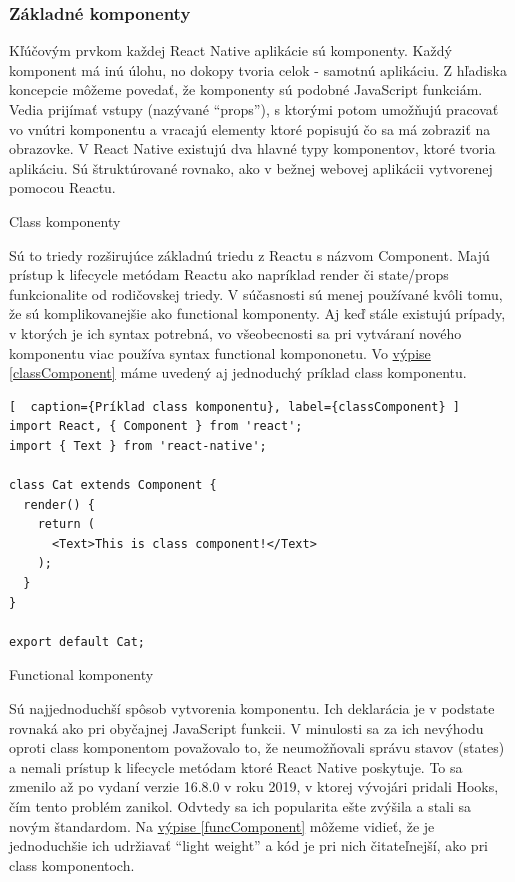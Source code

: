 \subsubsection{Základné komponenty}
Kľúčovým prvkom každej React Native aplikácie sú komponenty. Každý komponent má inú úlohu, no dokopy tvoria celok - samotnú aplikáciu. Z hľadiska koncepcie môžeme povedať, že komponenty sú podobné JavaScript funkciám. Vedia prijímať vstupy (nazývané ``props''), s ktorými potom umožňujú pracovať vo vnútri komponentu a vracajú elementy ktoré popisujú čo sa má zobraziť na obrazovke. V React Native existujú dva hlavné typy komponentov, ktoré tvoria aplikáciu. Sú štruktúrované rovnako, ako v bežnej webovej aplikácii vytvorenej pomocou Reactu.
\begin{itemize}[leftmargin=*]
{\bf \item Class komponenty} \newline
Sú to triedy rozširujúce základnú triedu z Reactu s názvom Component. Majú prístup k lifecycle metódam Reactu ako napríklad render či state/props funkcionalite od rodičovskej triedy. V súčasnosti sú menej používané kvôli tomu, že sú komplikovanejšie ako functional komponenty. Aj keď stále existujú prípady, v ktorých je ich syntax potrebná, vo všeobecnosti sa pri vytváraní nového komponentu viac používa syntax functional kompononetu. Vo \hyperref[classComponent]{výpise \ref{classComponent}} máme uvedený aj jednoduchý príklad class komponentu.  \\

\begin{lstlisting}[  caption={Príklad class komponentu}, label={classComponent} ]
import React, { Component } from 'react';
import { Text } from 'react-native';

class Cat extends Component {
  render() {
    return (
      <Text>This is class component!</Text>
    );
  }
}

export default Cat;
\end{lstlisting}
{\bf \item Functional komponenty} \newline
Sú najjednoduchší spôsob vytvorenia komponentu. Ich deklarácia je v podstate rovnaká ako pri obyčajnej JavaScript funkcii. V minulosti sa za ich nevýhodu oproti class komponentom považovalo to, že neumožňovali správu stavov (states) a nemali prístup k lifecycle metódam ktoré React Native poskytuje. To sa zmenilo až po vydaní verzie 16.8.0 v roku 2019, v ktorej vývojári pridali Hooks, čím tento problém zanikol. Odvtedy sa ich popularita ešte zvýšila a stali sa novým štandardom. Na \hyperref[funcComponent]{výpise \ref{funcComponent}} môžeme vidieť, že je jednoduchšie ich udržiavať ``light weight'' a kód je pri nich čitateľnejší, ako pri class komponentoch. \\


\end{itemize}
